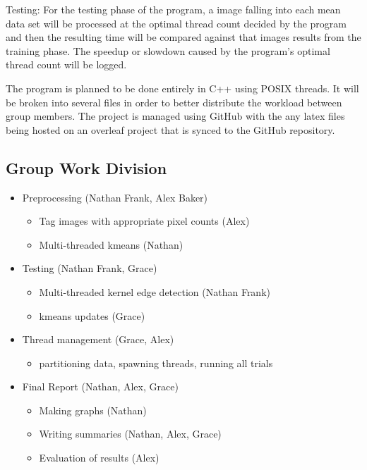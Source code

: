 \documentclass{article}
\begin{document}
\begin{multicols}{2}
                Testing: For the testing phase of the program, a image falling into each mean data set will be processed at the optimal thread count decided by the program and then the resulting time will be compared against that images results from the training phase.  The speedup or slowdown caused by the program's optimal thread count will be logged.
                
                The program is planned to be done entirely in C++ using POSIX threads.  It will be broken into several files in order to better distribute the workload between group members.  The project is managed using GitHub with the any latex files being hosted on an overleaf project that is synced to the GitHub repository.
            
            \subsection{Group Work Division}
                \begin{itemize}
                \item Preprocessing (Nathan Frank, Alex Baker)
                    \begin{itemize}
                    \item Tag images with appropriate pixel counts (Alex)
                    \item Multi-threaded kmeans (Nathan)
                    \end{itemize}
                    
                \item Testing (Nathan Frank, Grace)
                    \begin{itemize}
                    \item Multi-threaded kernel edge detection (Nathan Frank)
                    \item kmeans updates (Grace)
                    \end{itemize}
                
                \item Thread management (Grace, Alex)
                    \begin{itemize}
                    \item partitioning data, spawning threads, running all trials
                    \end{itemize}
                    
                \item Final Report (Nathan, Alex, Grace)
                    \begin{itemize}
                    \item Making graphs (Nathan)
                    \item Writing summaries (Nathan, Alex, Grace)
                    \item Evaluation of results (Alex)
                    \end{itemize}
                    

\end{itemize}
\end{multicols}
\end{document}
